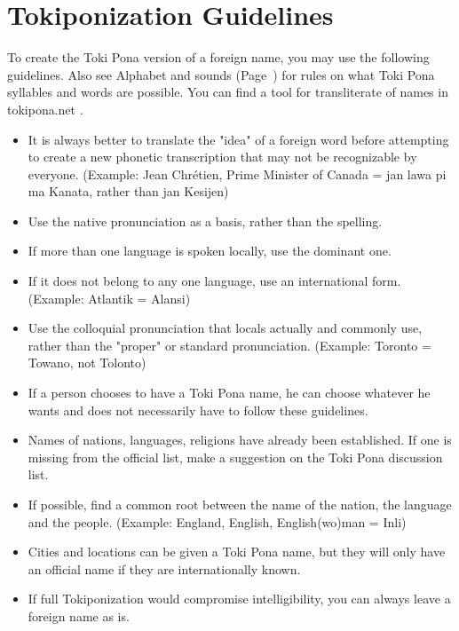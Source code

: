 
\section{Tokiponization Guidelines}

\label{'phonet_trans'}

To create the Toki Pona version of a foreign name, you may use the following guidelines.
Also see Alphabet and sounds (Page~\pageref{'pronunciation_alphabet'}) for rules on what Toki Pona syllables and words are possible.
You can find a tool for transliterate of names in tokipona.net \cite{www:tokipona.net:01}.

\begin{itemize}
    \item
          It is always better to translate the "idea" of a foreign word before attempting to create a new phonetic transcription that may not be recognizable by everyone.
          (Example: Jean Chrétien, Prime Minister of Canada = jan lawa pi ma Kanata, rather than jan Kesijen)
    \item
          Use the native pronunciation as a basis, rather than the spelling.
    \item
          If more than one language is spoken locally, use the dominant one.
    \item
          If it does not belong to any one language, use an international form.
          (Example: Atlantik = Alansi)
    \item
          Use the colloquial pronunciation that locals actually and commonly use, rather than the "proper" or standard pronunciation.
          (Example: Toronto = Towano, not Tolonto)
    \item
          If a person chooses to have a Toki Pona name, he can choose whatever he wants and does not necessarily have to follow these guidelines.
    \item
          Names of nations, languages, religions have already been established.
          If one is missing from the official list, make a suggestion on the Toki Pona discussion list.
    \item
          If possible, find a common root between the name of the nation, the language and the people.
          (Example: England, English, English(wo)man = Inli)
    \item
          Cities and locations can be given a Toki Pona name, but they will only have an official name if they are internationally known.
    \item
          If full Tokiponization would compromise intelligibility, you can always leave a foreign name as is.
\end{itemize}

